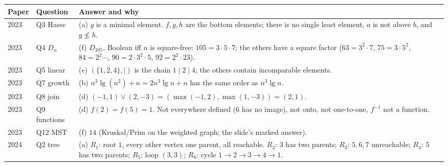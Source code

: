 \documentclass{fkt-notes}
\theoremstyle{definition}
\begin{document}
\begin{center}
  \small\renewcommand{\arraystretch}{1.25}
  \begin{tabular}{@{}llp{}@{}}
    \toprule
    Paper & Question     & Answer and why                                                                                                                                                                                                \\
    \midrule
    2023  & Q3 Hasse     & (a) $g$ is a minimal element. $f,g,h$ are the bottom elements; there is no single least element, $a$ is not above $b$, and $g\not\le h$.                                                                      \\
    2023  & Q4 $D_n$     & (f) $D_{105}$. Boolean iff $n$ is square-free: $105=3\cdot5\cdot7$; the others have a square factor ($63=3^2\cdot7$, $75=3\cdot5^2$, $84=2^2\cdots$, $90=2\cdot3^2\cdot5$, $92=2^2\cdot23$).                  \\
    2023  & Q5 linear    & (e) $(\{1,2,4\},\mid)$ is the chain $1\mid2\mid4$; the others contain incomparable elements.                                                                                                                  \\
    2023  & Q7 growth    & (b) $n^3\lg(n^2)+n=2n^3\lg n+n$ has the same order as $n^3\lg n$.                                                                                                                                             \\
    2023  & Q8 join      & (d) $(-1,1)\vee(2,-3)=(\max(-1,2),\max(1,-3))=(2,1)$.                                                                                                                                                         \\
    2023  & Q9 functions & (d) $f(2)=f(5)=1$. Not everywhere defined ($6$ has no image), not onto, not one-to-one, $f^{-1}$ not a function.                                                                                              \\
    2023  & Q12 MST      & (f) $14$ (Kruskal/Prim on the weighted graph; the slide's marked answer).                                                                                                                                     \\
    2024  & Q2 tree      & (a) $R_1$: root $1$, every other vertex one parent, all reachable. $R_2$: $3$ has two parents; $R_3$: $5,6,7$ unreachable; $R_4$: $5$ has two parents; $R_5$: loop $(3,3)$; $R_6$: cycle $1\to2\to3\to4\to1$. \\

\end{tabular}
\end{center}
\end{document}
